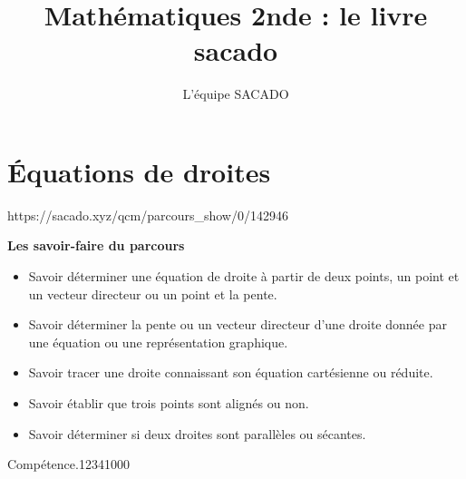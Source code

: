 



\title{Mathématiques 2nde  : le livre sacado}
\author{L'équipe SACADO}




\chapter{Équations de droites}
{https://sacado.xyz/qcm/parcours_show/0/142946}
{
 \begin{CpsCol}
	\textbf{Les savoir-faire du parcours}
 	\begin{itemize}
 		\item Savoir déterminer une équation de droite à partir de deux points, un point et un vecteur directeur ou un point et la pente.
		\item Savoir déterminer la pente ou un vecteur directeur d'une droite donnée par une équation ou
une représentation graphique.
		\item Savoir tracer une droite connaissant son équation cartésienne ou réduite.
		\item Savoir établir que trois points sont alignés ou non.
		\item Savoir déterminer si deux droites sont parallèles ou sécantes.
 	\end{itemize}
 \end{CpsCol}

\begin{His}
\end{His}

\begin{ExoDec}{Compétence.}{1234}{1}{0}{0}{0}
\end{ExoDec}
}


